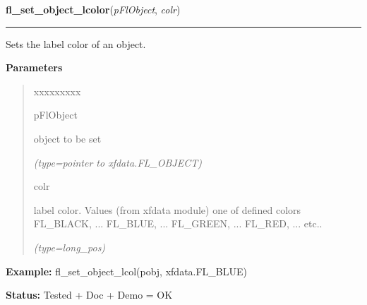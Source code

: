 \hspace{.8\funcindent}\begin{boxedminipage}{\funcwidth}

    \raggedright \textbf{fl\_set\_object\_lcolor}(\textit{pFlObject}, \textit{colr})

    \vspace{-1.5ex}

    \rule{\textwidth}{0.5\fboxrule}
\setlength{\parskip}{2ex}
    Sets the label color of an object.

\setlength{\parskip}{1ex}
      \textbf{Parameters}
      \vspace{-1ex}

      \begin{quote}
        \begin{Ventry}{xxxxxxxxx}

          \item[pFlObject]

          object to be set

            {\it (type=pointer to xfdata.FL\_OBJECT)}

          \item[colr]

          label color. Values (from xfdata module) one of defined colors 
          FL\_BLACK, ... FL\_BLUE, ... FL\_GREEN, ... FL\_RED, ... etc..

            {\it (type=long\_pos)}

        \end{Ventry}

      \end{quote}

\textbf{Example:} fl\_set\_object\_lcol(pobj, xfdata.FL\_BLUE)



\textbf{Status:} Tested + Doc + Demo = OK



    \end{boxedminipage}

    \label{xformslib:flbasic:fl_get_object_lcol}

    \vspace{0.5ex}

